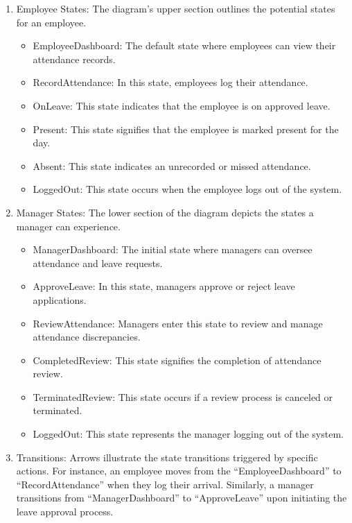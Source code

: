 \documentclass[a4paper, 12pt]{article}
\begin{document}
\begin{enumerate}
    \item Employee States: The diagram’s upper section outlines the potential states for an employee.
    \begin{itemize}
        \item EmployeeDashboard: The default state where employees can view their attendance records.
        \item RecordAttendance: In this state, employees log their attendance.
        \item OnLeave: This state indicates that the employee is on approved leave.
        \item Present: This state signifies that the employee is marked present for the day.
        \item Absent: This state indicates an unrecorded or missed attendance.
        \item LoggedOut: This state occurs when the employee logs out of the system.
    \end{itemize}
    \item Manager States: The lower section of the diagram depicts the states a manager can experience.
    \begin{itemize}
        \item ManagerDashboard: The initial state where managers can oversee attendance and leave requests.
        \item ApproveLeave: In this state, managers approve or reject leave applications.
        \item ReviewAttendance: Managers enter this state to review and manage attendance discrepancies.
        \item CompletedReview: This state signifies the completion of attendance review.
        \item TerminatedReview: This state occurs if a review process is canceled or terminated.
        \item LoggedOut: This state represents the manager logging out of the system.
    \end{itemize}
    \item Transitions: Arrows illustrate the state transitions triggered by specific actions. For instance, an employee moves from the “EmployeeDashboard” to “RecordAttendance” when they log their arrival. Similarly, a manager transitions from “ManagerDashboard” to “ApproveLeave” upon initiating the leave approval process.
\end{enumerate}
\end{document}
